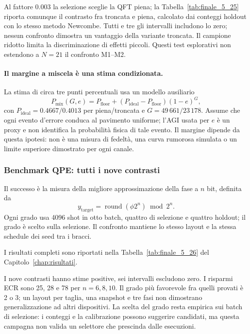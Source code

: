 \begin{onehalfspace}
Al fattore 0.003 la selezione sceglie la QFT piena; la Tabella~\ref{tab:finale_5_25} riporta
comunque il contrasto fra troncata e piena, calcolato dai conteggi holdout
con lo stesso metodo Newcombe. Tutti e tre gli intervalli includono lo zero; nessun confronto dimostra
un vantaggio della variante troncata. Il campione ridotto limita la
discriminazione di effetti piccoli. Questi test esplorativi non
estendono a $N=21$ il confronto M1--M2.

\paragraph{Il margine a miscela è una stima condizionata.}
La stima di circa tre punti percentuali usa un modello ausiliario
\begin{equation}
 P_{\mathrm{mix}}(G,e)=P_{\mathrm{floor}}+
 (P_{\mathrm{ideal}}-P_{\mathrm{floor}})(1-e)^G,
 \label{eq:aqft_miscela}
\end{equation}
con $P_{\mathrm{ideal}}=0.4667/0.4013$ per piena/troncata e
$G=49\,661/23\,178$. Assume che ogni evento d'errore conduca al
pavimento uniforme; l'AGI usata per $e$ è un proxy e non identifica la
probabilità fisica di tale evento. Il margine dipende da questa ipotesi:
non è una misura di fedeltà, una curva rumorosa simulata o un limite
superiore dimostrato per ogni canale.

\subsubsection{Benchmark QPE: tutti i nove contrasti}

Il successo è la misura della migliore approssimazione della fase a
$n$ bit, definita da
\begin{equation}
 y_{\mathrm{target}}=\operatorname{round}(\phi 2^n)\bmod 2^n.
 \label{eq:aqft_qpe_target}
\end{equation}
Ogni grado usa 4096 shot in otto batch, quattro di selezione e quattro
holdout; il grado è scelto sulla selezione. Il confronto mantiene lo
stesso layout e la stessa schedule dei seed tra i bracci.

I risultati completi sono riportati nella Tabella~\ref{tab:finale_5_26} del Capitolo~\ref{chap:risultati}.

I nove contrasti hanno stime positive, sei intervalli escludono zero.
I risparmi ECR sono 25, 28 e 78 per $n=6,8,10$.
Il grado più favorevole fra quelli provati è 2 o 3; un layout per taglia,
una snapshot e tre fasi non dimostrano generalizzazione ad altri dispositivi.
La scelta del grado resta empirica sui batch di selezione: i conteggi e
la calibrazione possono suggerire candidati, ma questa campagna non valida
un selettore che prescinda dalle esecuzioni.


\end{onehalfspace}
